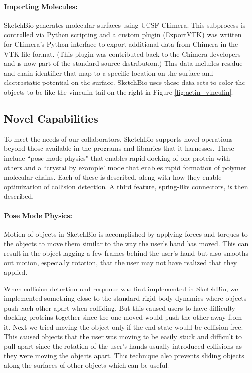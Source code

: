 \documentclass[twocolumn]{bmcart}%
\begin{document}
\paragraph*{Importing Molecules:}
SketchBio generates molecular surfaces using UCSF Chimera.
This subprocess is controlled via Python scripting and a custom plugin (ExportVTK) was written for Chimera's Python interface to export additional data from Chimera in the VTK file format.
(This plugin was contributed back to the Chimera developers and is now part of the standard source distribution.)
This data includes residue and chain identifier that map to a specific location on the surface and electrostatic potential on the surface.
SketchBio uses these data sets to color the objects to be like the vinculin tail on the right in Figure \ref{fig:actin_vinculin}.

\subsection*{Novel Capabilities}

To meet the needs of our collaborators, SketchBio supports novel operations beyond those available in the programs and libraries that it harnesses.
These include ``pose-mode physics" that enables rapid docking of one protein with others and a ``crystal by example" mode that enables rapid formation of polymer molecular chains.
Each of these is described, along with how they enable optimization of collision detection.  A third feature, spring-like connectors, is then described.

\paragraph*{Pose Mode Physics:}
Motion of objects in SketchBio is accomplished by applying forces and torques to the objects to move them similar to the way the user's hand has moved.
This can result in the object lagging a few frames behind the user's hand but also smooths out motion, especially rotation, that the user may not have realized that they applied.

When collision detection and response was first implemented in SketchBio, we implemented something close to the standard rigid body dynamics where objects push each other apart when colliding.
But this caused users to have difficulty docking proteins together since the one moved would push the other away from it.
Next we tried moving the object only if the end state would be collision free.
This caused objects that the user was moving to be easily stuck and difficult to pull apart since the rotation of the user's hands usually introduced collisions as they were moving the objects apart.
This technique also prevents sliding objects along the surfaces of other objects which can be useful.
\end{document}
